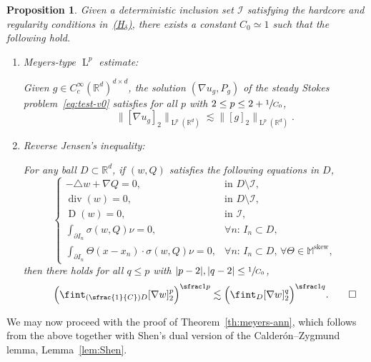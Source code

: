 \documentclass[JEP,XML,SOM,Unicode,published]{cedram}
\let\mathcal\mathscr
\newcommand{\Hd}{\hyperref[Hd]{\textup{(H$_\delta$)}}\xspace}
\newcommand{\Psfrac}[2]{(\sfrac{#1}{#2})}
\theoremstyle{plain}
\newtheorem{propo}[theor]{Proposition}
\theoremstyle{definition}
\newcommand{\R}{\mathbb R}
\newcommand{\Ic}{\mathcal I}
\newcommand{\Md}{\mathbb M}
\newcommand{\D}{\operatorname{D}}
\newcommand{\Ld}{\operatorname{L}}
\newcommand{\Div}{{\operatorname{div}}}
\newcommand{\Skew}{{\operatorname{skew}}}
\begin{document}
\begin{propo}\label{prop:Meyers}
Given a deterministic inclusion set $\Ic$ satisfying the hardcore and regularity conditions in~\Hd,
there exists a constant $C_0\simeq1$ such that the following hold.
\begin{enumerate}\renewcommand{\theenumi}{\roman{enumi}}
\item\label{prop:Meyersi} \emph{Meyers-type $\Ld^p$ estimate:}
\par\noindent
Given $g\in C^\infty_c(\R^d)^{d\times d}$, the solution $(\nabla u_g,P_g)$ of the steady Stokes problem~\eqref{eq:test-v0}
satisfies for all $p$ with $2\le p\le2+\sfrac1{C_0}$,
\[\qquad\|[\nabla u_g]_2\|_{\Ld^p(\R^d)}\lesssim \|[g]_2\|_{\Ld^p(\R^d)}.\]
\item\label{prop:Meyersii} \emph{Reverse Jensen's inequality:}
\par\noindent
For any ball $D\subset\R^d$, if $(w,Q)$ satisfies the following equations in $D$,
\begin{equation*}
\begin{cases}
-\triangle w+\nabla Q=0,&\text{in $D\setminus\Ic$},\\
\Div(w)=0,&\text{in $D\setminus\Ic$},\\
\D(w)=0,&\text{in $\Ic$},\\
\int_{\partial I_{n}}\sigma(w,Q)\nu=0,&\forall n:\,I_{n}\subset D,\\
\int_{\partial I_{n}}\Theta(x-x_n)\cdot\sigma(w,Q)\nu=0,&\forall n:\,I_{n}\subset D,\,\forall\Theta\in\Md^\Skew,
\end{cases}
\end{equation*}
then there holds for all $q\le p$ with $|p-2|,|q-2|\le\sfrac1{C_0}$,
\[\qquad\Big(\fint_{\Psfrac1CD}[\nabla w]_2^p\Big)^{\sfrac1p}\lesssim \Big(\fint_{D}[\nabla w]_2^q\Big)^{\sfrac1q}.\qedhere\]
\end{enumerate}
\end{propo}

We may now proceed with the proof of Theorem~\ref{th:meyers-ann}, which follows from the above together with Shen's dual version of the Calderón--Zygmund lemma, \cf Lemma~\ref{lem:Shen}.
\end{document}
